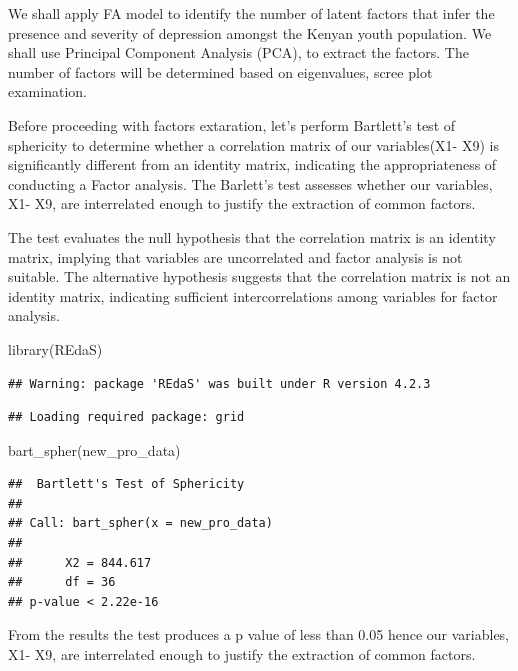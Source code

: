 \documentclass[
]{article}
\newenvironment{Shaded}{\begin{snugshade}}{\end{snugshade}}
\newcommand{\FunctionTok}[1]{\textcolor[rgb]{0.00,0.00,0.00}{#1}}
\newcommand{\NormalTok}[1]{#1}
\begin{document}
We shall apply FA model to identify the number of latent factors that
infer the presence and severity of depression amongst the Kenyan youth
population. We shall use Principal Component Analysis (PCA), to extract
the factors. The number of factors will be determined based on
eigenvalues, scree plot examination.

Before proceeding with factors extaration, let's perform Bartlett's test
of sphericity to determine whether a correlation matrix of our
variables(X1- X9) is significantly different from an identity matrix,
indicating the appropriateness of conducting a Factor analysis. The
Barlett's test assesses whether our variables, X1- X9, are interrelated
enough to justify the extraction of common factors.

The test evaluates the null hypothesis that the correlation matrix is an
identity matrix, implying that variables are uncorrelated and factor
analysis is not suitable. The alternative hypothesis suggests that the
correlation matrix is not an identity matrix, indicating sufficient
intercorrelations among variables for factor analysis.

\begin{Shaded}
\begin{Highlighting}[]
\FunctionTok{library}\NormalTok{(REdaS)}
\end{Highlighting}
\end{Shaded}

\begin{verbatim}
## Warning: package 'REdaS' was built under R version 4.2.3
\end{verbatim}

\begin{verbatim}
## Loading required package: grid
\end{verbatim}

\begin{Shaded}
\begin{Highlighting}[]
\FunctionTok{bart\_spher}\NormalTok{(new\_pro\_data)}
\end{Highlighting}
\end{Shaded}

\begin{verbatim}
##  Bartlett's Test of Sphericity
## 
## Call: bart_spher(x = new_pro_data)
## 
##      X2 = 844.617
##      df = 36
## p-value < 2.22e-16
\end{verbatim}

From the results the test produces a p value of less than 0.05 hence our
variables, X1- X9, are interrelated enough to justify the extraction of
common factors.
\end{document}
